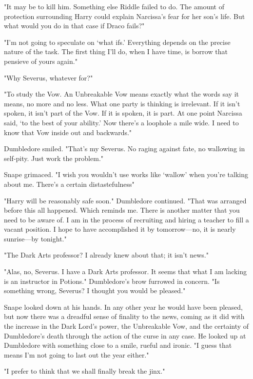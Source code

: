 "It may be to kill him. Something else Riddle failed to do. The amount of protection surrounding Harry could explain Narcissa's fear for her son's life. But what would you do in that case if Draco fails?"

"I'm not going to speculate on `what ifs.' Everything depends on the precise nature of the task. The first thing I'll do, when I have time, is borrow that pensieve of yours again."

"Why Severus, whatever for?"

"To study the Vow. An Unbreakable Vow means exactly what the words say it means, no more and no less. What one party is thinking is irrelevant. If it isn't spoken, it isn't part of the Vow. If it is spoken, it is part. At one point Narcissa said, `to the best of your ability.' Now there's a loophole a mile wide. I need to know that Vow inside out and backwards."

Dumbledore smiled. "That's my Severus. No raging against fate, no wallowing in self-pity. Just work the problem."

Snape grimaced. "I wish you wouldn't use works like `wallow' when you're talking about me. There's a certain distastefulness{\el}"

"Harry will be reasonably safe soon." Dumbledore continued. "That was arranged before this all happened. Which reminds me. There is another matter that you need to be aware of. I am in the process of recruiting and hiring a teacher to fill a vacant position. I hope to have accomplished it by tomorrow—no, it is nearly sunrise—by tonight."

"The Dark Arts professor? I already knew about that; it isn't news."

"Alas, no, Severus. I have a Dark Arts professor. It seems that what I am lacking is an instructor in Potions." Dumbledore's brow furrowed in concern. "Is something wrong, Severus? I thought you would be pleased."

Snape looked down at his hands. In any other year he would have been pleased, but now there was a dreadful sense of finality to the news, coming as it did with the increase in the Dark Lord's power, the Unbreakable Vow, and the certainty of Dumbledore's death through the action of the curse in any case. He looked up at Dumbledore with something close to a smile, rueful and ironic. "I guess that means I'm not going to last out the year either."

"I prefer to think that we shall finally break the jinx."

